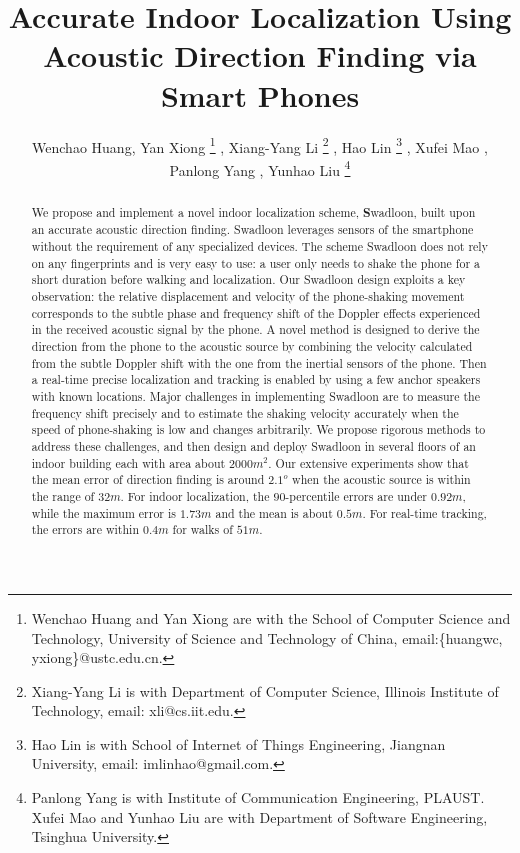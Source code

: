 \documentclass[]{sig-alternate-10pt}
\def \ourprotocol{Swadloon\xspace}
\begin{document}
\title{Accurate Indoor Localization Using Acoustic Direction Finding via Smart Phones}
\author{ Wenchao Huang, Yan Xiong 
\thanks{
    Wenchao Huang and Yan Xiong are with the School of Computer Science and Technology, University of Science and Technology of China, email:\{huangwc, yxiong\}@ustc.edu.cn. 
}
, Xiang-Yang Li
\thanks{
    Xiang-Yang Li is with Department of Computer Science, Illinois Institute of Technology, email: xli@cs.iit.edu.
}
, Hao Lin
\thanks{
    Hao Lin is with School of Internet of Things Engineering, Jiangnan University, email: imlinhao@gmail.com.
}
, Xufei Mao
, Panlong Yang
, Yunhao Liu
\thanks{
    Panlong Yang is with Institute of Communication Engineering, PLAUST.
    Xufei Mao and Yunhao Liu are with Department of Software Engineering, Tsinghua University.
}
}
\maketitle


\begin{abstract}
We propose and implement a novel indoor localization scheme,
 \textbf \ourprotocol, built upon an accurate acoustic direction finding.
 \ourprotocol leverages sensors of the smartphone
 without the requirement of any specialized devices.
The scheme \ourprotocol does not rely on any fingerprints and is very
 easy to use: a user only needs to shake the phone for a short
 duration before walking and localization.
Our  \ourprotocol design exploits  a key observation:
 the relative displacement and velocity of the phone-shaking
 movement corresponds to the subtle phase and frequency shift of the
 Doppler  effects experienced in the received acoustic signal by the
 phone.
A novel method is designed to derive the direction from the phone to
 the acoustic source  by combining the velocity calculated from the
 subtle Doppler shift with the one  from the inertial sensors of the
 phone.
Then a real-time precise localization and tracking is enabled by
 using a few anchor speakers with known locations.
Major challenges in implementing \ourprotocol are to measure the
 frequency shift precisely and to estimate the shaking velocity
 accurately when the speed of phone-shaking is low and changes
 arbitrarily.
We propose rigorous methods to address these challenges, and
 then design and deploy \ourprotocol in several  floors of an indoor
 building each with area  about $2000m^2$.
Our extensive experiments show that the  mean
 error of direction finding is around $2.1^o$ when the
 acoustic source is within the range of $32m$.
For indoor localization, the $90$-percentile errors are under $0.92m$,
 while the maximum error is $1.73m$ and the mean is about $0.5m$.
For real-time tracking, the errors are  within $0.4m$ for
 walks of  $51m$.
\end{abstract}
\end{document}
